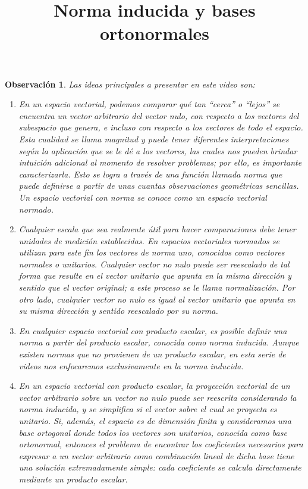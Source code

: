 \documentclass[12pt,dvipsnames]{article}
\newtheorem{obs}{Observación}[section]
\numberwithin{equation}{section}
\begin{document}
\title{Norma inducida y bases ortonormales}
\date{}
\maketitle

\begin{obs}
    Las ideas principales a presentar en este video son:

    \begin{enumerate}[label=(\roman*)]
        \item En un espacio vectorial, podemos comparar qué tan ``cerca'' o ``lejos'' se encuentra un vector arbitrario del vector nulo, con respecto a los vectores del subespacio que genera, e incluso con respecto a los vectores de todo el espacio. Esta cualidad se llama \emph{magnitud} y puede tener diferentes interpretaciones según la aplicación que se le dé a los vectores, las cuales nos pueden brindar intuición adicional al momento de resolver problemas; por ello, es importante caracterizarla. Esto se logra a través de una función llamada \emph{norma} que puede definirse a partir de unas cuantas observaciones geométricas sencillas. Un espacio vectorial con norma se conoce como un espacio vectorial \emph{normado}.

        \item Cualquier escala que sea realmente útil para hacer comparaciones debe tener unidades de medición establecidas. En espacios vectoriales normados se utilizan para este fin los vectores de norma uno, conocidos como vectores \emph{normales} o \emph{unitarios}. Cualquier vector no nulo puede ser reescalado de tal forma que resulte en el vector unitario que apunta en la misma dirección y sentido que el vector original; a este proceso se le llama \emph{normalización}. Por otro lado, cualquier vector no nulo es igual al vector unitario que apunta en su misma dirección y sentido reescalado por su norma.

        \item En cualquier espacio vectorial con producto escalar, es posible definir una norma a partir del producto escalar, conocida como \emph{norma inducida}. Aunque existen normas que no provienen de un producto escalar, en esta serie de videos nos enfocaremos exclusivamente en la norma inducida.

        \item En un espacio vectorial con producto escalar, la proyección vectorial de un vector arbitrario sobre un vector no nulo puede ser reescrita considerando la norma inducida, y se simplifica si el vector sobre el cual se proyecta es unitario. Si, además, el espacio es de dimensión finita y consideramos una base ortogonal donde todos los vectores son unitarios, conocida como base ortonormal, entonces el problema de encontrar los coeficientes necesarios para expresar a un vector arbitrario como combinación lineal de dicha base tiene una solución extremadamente simple: cada coeficiente se calcula directamente mediante un producto escalar.
    \end{enumerate}
\end{obs}
\end{document}
